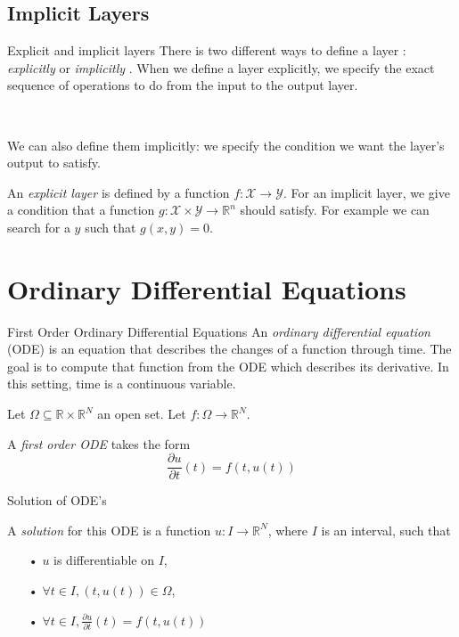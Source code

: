 \documentclass[11pt]{beamer}
\begin{document}
\subsection{Implicit Layers}
\begin{frame}{Explicit and implicit layers}
There is two different ways to define a layer : \textit{explicitly} or \textit{implicitly} \cite{2}. When we define a layer explicitly, we specify the exact sequence of operations to do from the input to the output layer. 

~

We can also define them implicitly: we specify the condition we want the layer's output to satisfy. 

\begin{definition}
An \textit{explicit layer} is defined by a function $f : \mathcal{X} \rightarrow \mathcal{Y}$. For an implicit layer, we give a condition that a function $g: \mathcal{X} \times \mathcal{Y} \rightarrow \mathbb{R}^n$ should satisfy. For example we can search for a $y$ such that $g(x,y) = 0$.
\end{definition}
\end{frame}

\section{Ordinary Differential Equations}
\begin{frame}{First Order Ordinary Differential Equations}
An\textit{ ordinary differential equation} (ODE) \cite{9} is an equation that describes the changes of a function through time. The goal is to compute that function from the ODE which describes its derivative. In this setting, time is a continuous variable.

\begin{definition}
Let $\Omega \subseteq \mathbb{R} \times \mathbb{R}^N$ an open set. Let $f: \Omega \rightarrow \mathbb{R}^N$. 

A \textit{first order ODE} takes the form
$$
\frac{\partial u}{\partial t}(t) = f(t,u(t))
$$
\end{definition}
\end{frame}

\begin{frame}{Solution of ODE's}
\begin{definition}
A \textit{solution} for this ODE is a function $u : I \rightarrow \mathbb{R}^N$, where $I$ is an interval, such that
	\begin{itemize}
	\item[•] $u$ is differentiable on $I$,
	\item[•] $\forall t \in I, (t, u(t)) \in \Omega$,
	\item[•] $\forall t \in I, \frac{\partial u}{\partial t}(t) = f(t, u(t))$
	\end{itemize}
\end{definition}
\end{frame}
\end{document}
